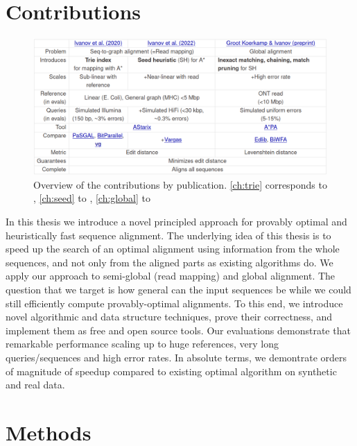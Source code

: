 \section*{Contributions}


\begin{figure}[h]
  \includegraphics[width=1.0\linewidth]{media/ownpubs-table.png}
  \caption{Overview of the contributions by publication. \cref{ch:trie}
  corresponds to \citep{ivanov2020astarix}, \cref{ch:seed} to
  \citep{ivanov2022fast}, \cref{ch:global} to \citep{koerkamp2022exact}}
  \label{tab:ownpubs}
\end{figure}

In this thesis we introduce a novel principled approach for provably optimal and
heuristically fast sequence alignment. The underlying idea of this thesis is to
speed up the search of an optimal alignment using information from the whole
sequences, and not only from the aligned parts as existing algorithms do. We
apply our approach to semi-global (read mapping) and global alignment. The
question that we target is how general can the input sequences be while we could
still efficiently compute provably-optimal alignments. To this end, we introduce
novel algorithmic and data structure techniques, prove their correctness, and
implement them as free and open source tools. Our evaluations demonstrate that
remarkable performance scaling up to huge references, very long
queries/sequences and high error rates. In absolute terms, we demontrate orders
of magnitude of speedup compared to existing optimal algorithm on synthetic and
real data.

\section*{Methods}

